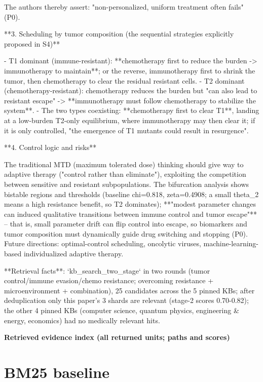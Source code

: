 \documentclass[10pt]{article}
\begin{document}
\begin{AnswerText}
The authors thereby assert: "non-personalized, uniform treatment often fails" (P0).

**3. Scheduling by tumor composition (the sequential strategies explicitly proposed in S4)**

- T1 dominant (immune-resistant): **chemotherapy first to reduce the burden -> immunotherapy to maintain**; or the reverse, immunotherapy first to shrink the tumor, then chemotherapy to clear the residual resistant cells.
- T2 dominant (chemotherapy-resistant): chemotherapy reduces the burden but "can also lead to resistant escape" -> **immunotherapy must follow chemotherapy to stabilize the system**.
- The two types coexisting: **chemotherapy first to clear T1**, landing at a low-burden T2-only equilibrium, where immunotherapy may then clear it; if it is only controlled, "the emergence of T1 mutants could result in resurgence".

**4. Control logic and risks**

The traditional MTD (maximum tolerated dose) thinking should give way to adaptive therapy ("control rather than eliminate"), exploiting the competition between sensitive and resistant subpopulations. The bifurcation analysis shows bistable regions and thresholds (baseline chi=0.818, zeta=0.4908; a small theta_2 means a high resistance benefit, so T2 dominates); **"modest parameter changes can induced qualitative transitions between immune control and tumor escape"** -- that is, small parameter drift can flip control into escape, so biomarkers and tumor composition must dynamically guide drug switching and stopping (P0). Future directions: optimal-control scheduling, oncolytic viruses, machine-learning-based individualized adaptive therapy.

**Retrieval facts**: `kb_search_two_stage` in two rounds (tumor control/immune evasion/chemo resistance; overcoming resistance + microenvironment + combination), 25 candidates across the 5 pinned KBs; after deduplication only this paper's 3 shards are relevant (stage-2 scores 0.70-0.82); the other 4 pinned KBs (computer science, quantum physics, engineering & energy, economics) had no medically relevant hits.
\end{AnswerText}

\textbf{Retrieved evidence index (all returned units; paths and scores) }
\begin{EvidenceText}
\end{EvidenceText}
\section{BM25 baseline}
\end{document}
